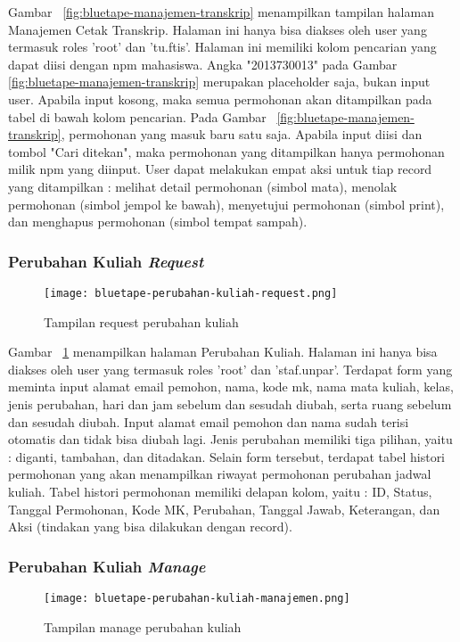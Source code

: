 	Gambar~ \ref{fig:bluetape-manajemen-transkrip} menampilkan tampilan halaman Manajemen Cetak Transkrip. Halaman ini hanya bisa diakses oleh user yang termasuk roles 'root' dan 'tu.ftis'. Halaman ini memiliki kolom pencarian yang dapat diisi dengan npm mahasiswa. Angka "2013730013" pada Gambar~ \ref{fig:bluetape-manajemen-transkrip} merupakan placeholder saja, bukan input user. Apabila input kosong, maka semua permohonan akan ditampilkan pada tabel di bawah kolom pencarian. Pada Gambar~ \ref{fig:bluetape-manajemen-transkrip}, permohonan yang masuk baru satu saja. Apabila input diisi dan tombol "Cari ditekan", maka permohonan yang ditampilkan hanya permohonan milik npm yang diinput. User dapat melakukan empat aksi untuk tiap record yang ditampilkan : melihat detail permohonan (simbol mata), menolak permohonan (simbol jempol ke bawah), menyetujui permohonan (simbol print), dan menghapus permohonan (simbol tempat sampah).
	
	\subsubsection{Perubahan Kuliah \textit{Request}}
	\begin{figure}[H]
		\centering  
		\texttt{[image: bluetape-perubahan-kuliah-request.png]}  
		\caption[Tampilan request perubahan kuliah]{Tampilan request perubahan kuliah} 
		\label{fig:bluetape-perubahan-kuliah-request} 
	\end{figure}
	
	Gambar~ \ref{fig:bluetape-perubahan-kuliah-request} menampilkan halaman Perubahan Kuliah. Halaman ini hanya bisa diakses oleh user yang termasuk roles 'root' dan 'staf.unpar'. Terdapat form yang meminta input alamat email pemohon, nama, kode mk, nama mata kuliah, kelas, jenis perubahan, hari dan jam sebelum dan sesudah diubah, serta ruang sebelum dan sesudah diubah. Input alamat email pemohon dan nama sudah terisi otomatis dan tidak bisa diubah lagi. Jenis perubahan memiliki tiga pilihan, yaitu : diganti, tambahan, dan ditadakan. Selain form tersebut, terdapat tabel histori permohonan yang akan menampilkan riwayat permohonan perubahan jadwal kuliah. Tabel histori permohonan memiliki delapan kolom, yaitu : ID, Status, Tanggal Permohonan, Kode MK, Perubahan, Tanggal Jawab, Keterangan, dan Aksi (tindakan yang bisa dilakukan dengan record).
	
	\subsubsection{Perubahan Kuliah \textit{Manage}}
	\begin{figure}[H]
		\centering  
		\texttt{[image: bluetape-perubahan-kuliah-manajemen.png]}  
		\caption[Tampilan manage perubahan kuliah]{Tampilan manage perubahan kuliah} 
		\label{fig:bluetape-perubahan-kuliah-manajemen} 
	\end{figure}
	
